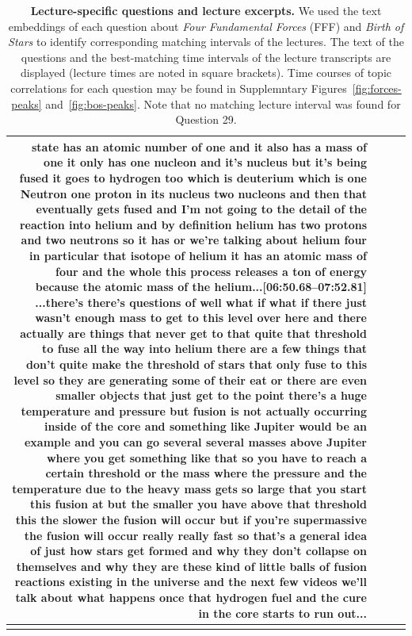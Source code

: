 \documentclass[10pt]{article}
\begin{document}
\begin{tiny}
\begin{longtable}{|r|p{0.375in}|p{1.275in}|p{3.5in}|}
state has an atomic number of one and it also has a mass of one it only has one nucleon and it's nucleus but it's being fused it goes to hydrogen too which is deuterium which is one Neutron one proton in its nucleus two nucleons and then that eventually gets fused and I'm not going to the detail of the reaction into helium and by definition helium has two protons and two neutrons so it has or we're talking about helium four in particular that isotope of helium it has an atomic mass of four and the whole this process releases a ton of energy because the atomic mass of the helium...\newline\textbf{[06:50.68--07:52.81]} ...there's there's questions of well what if what if there just wasn't enough mass to get to this level over here and there actually are things that never get to that quite that threshold to fuse all the way into helium there are a few things that don't quite make the threshold of stars that only fuse to this level so they are generating some of their eat or there are even smaller objects that just get to the point there's a huge temperature and pressure but fusion is not actually occurring inside of the core and something like Jupiter would be an example and you can go several several masses above Jupiter where you get something like that so you have to reach a certain threshold or the mass where the pressure and the temperature due to the heavy mass gets so large that you start this fusion at but the smaller you have above that threshold this the slower the fusion will occur but if you're supermassive the fusion will occur really really fast so that's a general idea of just how stars get formed and why they don't collapse on themselves and why they are these kind of little balls of fusion reactions existing in the universe and the next few videos we'll talk about what happens once that hydrogen fuel and the cure in the core starts to run out... \\\hline

\caption{\textbf{Lecture-specific questions and lecture excerpts.} We used the
text embeddings of each question about \textit{Four Fundamental Forces} (FFF)
and \textit{Birth of Stars} to identify corresponding matching intervals of the
lectures. The text of the questions and the best-matching time intervals of the
lecture transcripts are displayed (lecture times are noted in square brackets).
Time courses of topic correlations for each question may be found in
Supplemntary Figures~\ref{fig:forces-peaks} and~\ref{fig:bos-peaks}. Note that
no matching lecture interval was found for Question 29.} 
\label{tab:matches}
\end{longtable}
\end{tiny}
\end{document}
